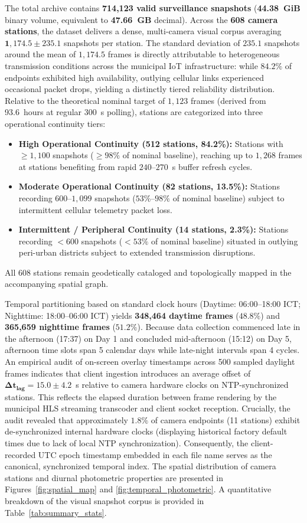 \documentclass[preprint,12pt]{elsarticle}
\begin{document}
The total archive contains \textbf{714,123 valid surveillance snapshots} (\textbf{44.38~GiB} binary volume, equivalent to \textbf{47.66~GB} decimal). Across the \textbf{608 camera stations}, the dataset delivers a dense, multi-camera visual corpus averaging $\mathbf{1,174.5 \pm 235.1}$ snapshots per station. The standard deviation of $235.1$ snapshots around the mean of $1,174.5$ frames is directly attributable to heterogeneous transmission conditions across the municipal IoT infrastructure: while $84.2\%$ of endpoints exhibited high availability, outlying cellular links experienced occasional packet drops, yielding a distinctly tiered reliability distribution. Relative to the theoretical nominal target of $1,123$ frames (derived from 93.6~hours at regular $300$~s polling), stations are categorized into three operational continuity tiers:
\begin{itemize}
    \item \textbf{High Operational Continuity (512 stations, 84.2\%):} Stations with $\ge 1,100$ snapshots ($\ge 98\%$ of nominal baseline), reaching up to $1,268$ frames at stations benefiting from rapid $240$--$270$~s buffer refresh cycles.
    \item \textbf{Moderate Operational Continuity (82 stations, 13.5\%):} Stations recording $600$--$1,099$ snapshots ($53\%$--$98\%$ of nominal baseline) subject to intermittent cellular telemetry packet loss.
    \item \textbf{Intermittent / Peripheral Continuity (14 stations, 2.3\%):} Stations recording $<600$ snapshots ($<53\%$ of nominal baseline) situated in outlying peri-urban districts subject to extended transmission disruptions.
\end{itemize}
All 608 stations remain geodetically cataloged and topologically mapped in the accompanying spatial graph.

Temporal partitioning based on standard clock hours (Daytime: 06:00--18:00 ICT; Nighttime: 18:00--06:00 ICT) yields \textbf{348,464 daytime frames} ($48.8\%$) and \textbf{365,659 nighttime frames} ($51.2\%$). Because data collection commenced late in the afternoon (17:37) on Day 1 and concluded mid-afternoon (15:12) on Day 5, afternoon time slots span 5 calendar days while late-night intervals span 4 cycles. An empirical audit of on-screen overlay timestamps across 500 sampled daylight frames indicates that client ingestion introduces an average offset of $\mathbf{\Delta t_{\text{lag}} = 15.0 \pm 4.2}$~s relative to camera hardware clocks on NTP-synchronized stations. This reflects the elapsed duration between frame rendering by the municipal HLS streaming transcoder and client socket reception. Crucially, the audit revealed that approximately $1.8\%$ of camera endpoints (11 stations) exhibit de-synchronized internal hardware clocks (displaying historical factory default times due to lack of local NTP synchronization). Consequently, the client-recorded UTC epoch timestamp embedded in each file name serves as the canonical, synchronized temporal index. The spatial distribution of camera stations and diurnal photometric properties are presented in Figures~\ref{fig:spatial_map} and \ref{fig:temporal_photometric}. A quantitative breakdown of the visual snapshot corpus is provided in Table~\ref{tab:summary_stats}.
\end{document}
